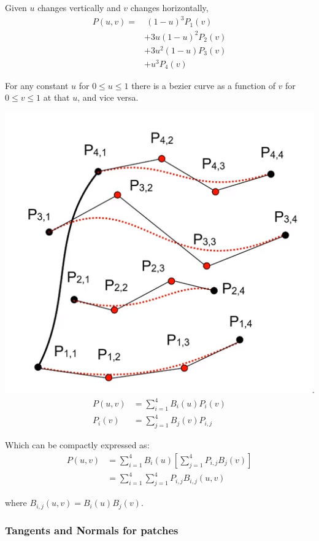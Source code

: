 \documentclass[12pt]{article}
\begin{document}
Given $u$ changes vertically and $v$ changes horizontally,
\begin{align*}
    P(u,v) =& \ (1-u)^3 P_1(v)\\
    &+ 3u(1-u)^2 P_2(v)\\
    &+ 3u^2(1-u) P_3(v)\\
    &+ u^3 P_4(v)
\end{align*}

For any constant $u$ for $0 \le u \le 1$ there is a bezier curve
as a function of $v$ for $0 \le v \le 1$ at that $u$, and vice
versa.

\includegraphics[scale=2]{images/bicubic-bezier-surface.png}
\begin{align*}
    P(u,v) &= \sum_{i=1}^4 B_i(u) P_i(v)\\
    P_i(v) &= \sum_{j=1}^4 B_j(v) P_{i,j}
\end{align*}

Which can be compactly expressed as:
\begin{align*}
    P(u,v) &= \sum_{i=1}^4 B_i(u) \left[ \sum_{j=1}^4 P_{i,j} B_j(v) \right]\\
           &= \sum_{i=1}^4 \sum_{j=1}^4 P_{i,j} B_{i,j}(u,v)
\end{align*}

where $B_{i,j}(u,v) = B_i(u)B_j(v)$.

\subsubsection{Tangents and Normals for patches}
\end{document}
